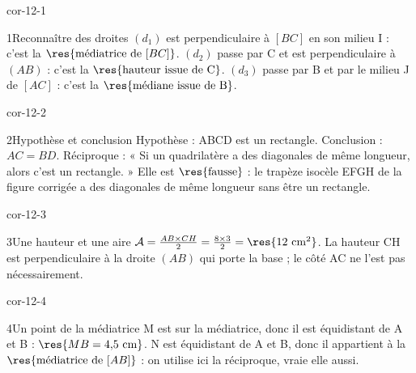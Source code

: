 \clearpage\pagestyle{otMain}\setlength{\otBlocEspacement}{2.5mm}\fontsize{11}{15}\selectfont{}
\begin{blocLivre}{cor-12-1}\begin{corrige}{1}{Reconnaître des droites}
$(d_1)$ est perpendiculaire à $[BC]$ en son milieu I : c’est la $\res{\text{médiatrice de }[BC]}$. $(d_2)$ passe par C et est perpendiculaire à $(AB)$ : c’est la $\res{\text{hauteur issue de C}}$. $(d_3)$ passe par B et par le milieu J de $[AC]$ : c’est la $\res{\text{médiane issue de B}}$.
\label{fig-cor-12-1}
\end{corrige}\end{blocLivre}
\begin{blocLivre}{cor-12-2}\begin{corrige}{2}{Hypothèse et conclusion}
Hypothèse : ABCD est un rectangle. Conclusion : $AC=BD$. Réciproque : « Si un quadrilatère a des diagonales de même longueur, alors c’est un rectangle. » Elle est $\res{\text{fausse}}$ : le trapèze isocèle EFGH de la figure corrigée a des diagonales de même longueur sans être un rectangle.
\label{fig-cor-12-2}
\end{corrige}\end{blocLivre}
\begin{blocLivre}{cor-12-3}\begin{corrige}{3}{Une hauteur et une aire}
$\mathcal A=\frac{AB\times CH}2=\frac{8\times3}2=\res{12\ \mathrm{cm}^2}$. La hauteur CH est perpendiculaire à la droite $(AB)$ qui porte la base ; le côté AC ne l’est pas nécessairement.
\label{fig-cor-12-3}
\end{corrige}\end{blocLivre}
\begin{blocLivre}{cor-12-4}\begin{corrige}{4}{Un point de la médiatrice}
M est sur la médiatrice, donc il est équidistant de A et B : $\res{MB=4{,}5\ \mathrm{cm}}$. N est équidistant de A et B, donc il appartient à la $\res{\text{médiatrice de }[AB]}$ : on utilise ici la réciproque, vraie elle aussi.
\label{fig-cor-12-4}
\end{corrige}\end{blocLivre}
